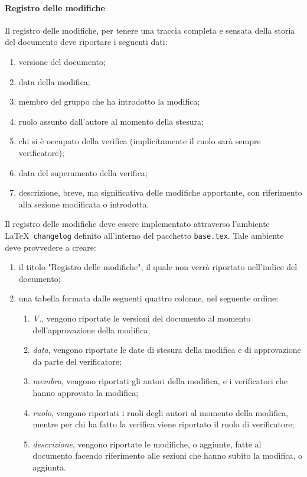         \paragraph{Registro delle modifiche} \label{sec:doc_changelog}
            Il registro delle modifiche, per tenere una traccia completa e sensata della storia del documento deve riportare i seguenti dati:
            \begin{multicols}{2}
            	\begin{enumerate}
            		\item versione del documento;
            		\item data della modifica;
            		\item membro del gruppo che ha introdotto la modifica;
            		\item ruolo assunto dall'autore al momento della stesura;
            		\item chi si è occupato della verifica (implicitamente il ruolo sarà sempre verificatore);
            		\item data del superamento della verifica;
            		\item descrizione, breve, ma significativa delle modifiche apportante, con riferimento alla sezione modificata o introdotta.
            	\end{enumerate}
            \end{multicols}
            Il registro delle modifiche deve essere implementato attraverso l'ambiente \LaTeX\ \verb|changelog| definito all'interno del pacchetto \verb|base.tex|. Tale ambiente deve provvedere a creare:
            \begin{enumerate}
                \item il titolo "Registro delle modifiche", il quale non verrà riportato nell'indice del documento;
                \item una tabella formata dalle seguenti quattro colonne, nel seguente ordine:
                \begin{enumerate}
                    \item \emph{V.}, vengono riportate le versioni del documento al momento dell'approvazione della modifica;
                    \item \emph{data}, vengono riportate le date di stesura della modifica e di approvazione da parte del verificatore;
                    \item \emph{membro}, vengono riportati gli autori della modifica, e i verificatori che hanno approvato la modifica;
                    \item \emph{ruolo}, vengono riportati i ruoli degli autori al momento della modifica, mentre per chi ha fatto la verifica viene riportato il ruolo di verificatore;
                    \item \emph{descrizione}, vengono riportate le modifiche, o aggiunte, fatte al documento facendo riferimento alle sezioni che hanno subito la modifica, o aggiunta. 
                \end{enumerate}
            \end{enumerate}
